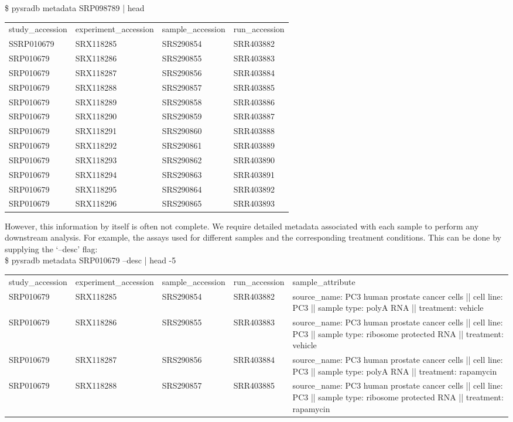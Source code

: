 \documentclass[9pt,a4paper]{extarticle}
\newenvironment{allintypewriter}{\ttfamily}{\par}
\begin{document}
\begin{allintypewriter}
\$ pysradb metadata SRP098789 | head
\begin{table}[H]
    \begin{tabular}{llll}
study_accession & experiment_accession & sample_accession & run_accession\\
SSRP010679 & SRX118285 & SRS290854 & SRR403882\\
SRP010679 & SRX118286 & SRS290855 & SRR403883\\
SRP010679 & SRX118287 & SRS290856 & SRR403884\\
SRP010679 & SRX118288 & SRS290857 & SRR403885\\
SRP010679 & SRX118289 & SRS290858 & SRR403886\\
SRP010679 & SRX118290 & SRS290859 & SRR403887\\
SRP010679 & SRX118291 & SRS290860 & SRR403888\\
SRP010679 & SRX118292 & SRS290861 & SRR403889\\
SRP010679 & SRX118293 & SRS290862 & SRR403890\\
SRP010679 & SRX118294 & SRS290863 & SRR403891\\
SRP010679 & SRX118295 & SRS290864 & SRR403892\\
SRP010679 & SRX118296 & SRS290865 & SRR403893
    \end{tabular}
\end{table}
\end{allintypewriter}

However, this information by itself is often not complete. 
We require detailed metadata associated with each sample to perform any downstream 
analysis. For example, the assays used for different samples and the corresponding treatment conditions.
This can be done by supplying the `--desc' flag:\\

\begin{allintypewriter}
\$ pysradb metadata SRP010679 --desc | head -5
\begin{table}[H]
    \begin{tabular}{llllp{40mm}}
study_accession & experiment_accession & sample_accession & run_accession & sample_attribute\\
SRP010679 & SRX118285 & SRS290854 & SRR403882 & source_name: PC3 human prostate cancer cells || cell line: PC3 || sample type: polyA RNA || treatment: vehicle\\
SRP010679 & SRX118286 & SRS290855 & SRR403883 & source_name: PC3 human prostate cancer cells || cell line: PC3 || sample type: ribosome protected RNA || treatment: vehicle\\
SRP010679 & SRX118287 & SRS290856 & SRR403884 & source_name: PC3 human prostate cancer cells || cell line: PC3 || sample type: polyA RNA || treatment: rapamycin\\
SRP010679 & SRX118288 & SRS290857 & SRR403885 & source_name: PC3 human prostate cancer cells || cell line: PC3 || sample type: ribosome protected RNA || treatment: rapamycin
    \end{tabular}
\end{table}
\end{allintypewriter}
\end{document}
